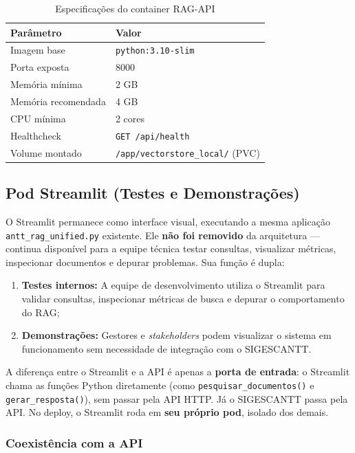 \documentclass[12pt, a4paper]{article}
\begin{document}
\begin{table}[H]
\centering
\small
\caption{Especificações do container RAG-API}
\label{tab:rag_container}
\begin{tabular}{l l}
\toprule
\textbf{Parâmetro} & \textbf{Valor} \\
\midrule
Imagem base & \texttt{python:3.10-slim} \\
Porta exposta & 8000 \\
Memória mínima & 2 GB \\
Memória recomendada & 4 GB \\
CPU mínima & 2 cores \\
Healthcheck & \texttt{GET /api/health} \\
Volume montado & \texttt{/app/vectorstore\_local/} (PVC) \\
\bottomrule
\end{tabular}
\end{table}

\subsection{Pod Streamlit (Testes e Demonstrações)}

O Streamlit permanece como interface visual, executando a mesma aplicação \texttt{antt\_rag\_unified.py} existente. Ele \textbf{não foi removido} da arquitetura --- continua disponível para a equipe técnica testar consultas, visualizar métricas, inspecionar documentos e depurar problemas. Sua função é dupla:

\begin{enumerate}[label=\textbf{\arabic*.}]
  \item \textbf{Testes internos:} A equipe de desenvolvimento utiliza o Streamlit para validar consultas, inspecionar métricas de busca e depurar o comportamento do RAG;
  \item \textbf{Demonstrações:} Gestores e \textit{stakeholders} podem visualizar o sistema em funcionamento sem necessidade de integração com o SIGESCANTT.
\end{enumerate}

A diferença entre o Streamlit e a API é apenas a \textbf{porta de entrada}: o Streamlit chama as funções Python diretamente (como \texttt{pesquisar\_documentos()} e \texttt{gerar\_resposta()}), sem passar pela API HTTP. Já o SIGESCANTT passa pela API. No deploy, o Streamlit roda em \textbf{seu próprio pod}, isolado dos demais.

\subsubsection*{Coexistência com a API}
\end{document}
